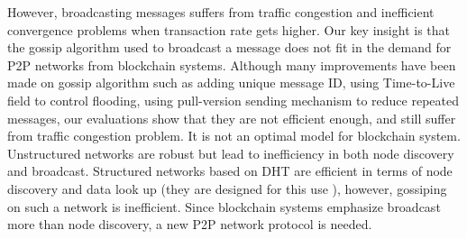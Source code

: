 However, broadcasting messages suffers from traffic congestion and inefficient convergence problems when transaction rate gets higher. Our key insight is that the gossip algorithm \cite{eugster2004epidemic} used to broadcast a message does not fit in the demand for P2P networks from blockchain systems. Although many improvements have been made on gossip algorithm such as adding unique message ID, using Time-to-Live field to control flooding, using pull-version sending mechanism to reduce repeated messages, our evaluations show that they are not efficient enough, and still suffer from traffic congestion problem. It is not an optimal model for blockchain system. Unstructured networks are robust but lead to inefficiency in both node discovery and broadcast. Structured networks based on DHT are efficient in terms of node discovery and data look up (they are designed for this use \cite{stoica2001chord}), however, gossiping on such a network is inefficient. Since blockchain systems emphasize broadcast more than node discovery, a new P2P network protocol is needed.


